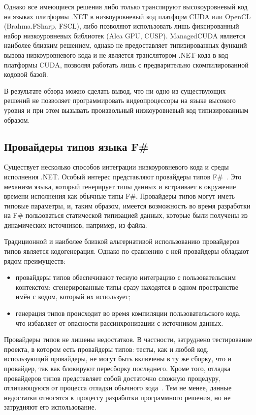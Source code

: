 Однако все имеющиеся решения либо только транслируют высокоуровневый код на языках платформы .NET в низкоуровневый код платформ CUDA или OpenCL (Brahma.FSharp, FSCL), либо позволяют использовать лишь фиксированный набор низкоуровневых библиотек (Alea GPU, CUSP). ManagedCUDA является наиболее близким решением, однако не предоставляет типизированных функций вызова низкоуровневого кода и не является транслятором .NET-кода в код платформы CUDA, позволяя работать лишь с предварительно скомпилированной кодовой базой.

В результате обзора можно сделать вывод, что ни одно из существующих решений не позволяет программировать видеопроцессоры на языке высокого уровня и при этом вызывать произвольный низкоуровневый код типизированным образом.

\subsection{Провайдеры типов языка F\#}
Существует несколько способов интеграции низкоуровневого кода и среды исполнения .NET. Особый интерес представляют провайдеры типов F\#~\cite{TypeProviders}. Это механизм языка, который генерирует типы данных и встраивает в окружение времени исполнения как обычные типы F\#. Провайдеры типов могут иметь типовые параметры, и, таким образом, имеется возможность во время разработки на F\# пользоваться статической типизацией данных, которые были получены из динамических источников, например, из файла.

Традиционной и наиболее близкой альтернативой использованию провайдеров типов является кодогенерация. Однако по сравнению с ней провайдеры обладают рядом преимуществ:
\begin{itemize}
    \item провайдеры типов обеспечивают тесную интеграцию с пользовательским контекстом: сгенерированные типы сразу находятся в одном пространстве имён с кодом, который их использует;
    \item генерация типов происходит во время компиляции пользовательского кода, что избавляет от опасности рассинхронизации с источником данных.
\end{itemize}

Провайдеры типов не лишены недостатков. В частности, затруднено тестирование проекта, в котором есть провайдеры типов: тесты, как и любой код, использующий провайдеры, не могут быть включены в ту же сборку, что и провайдер, так как блокируют пересборку последнего. Кроме того, отладка провайдеров типов представляет собой достаточно сложную процедуру, отличающуюся от процесса отладки обычного кода~\cite{TypeProvidersTips}. Тем не менее, данные недостатки относятся к процессу разработки программного решения, но не затрудняют его использование.

